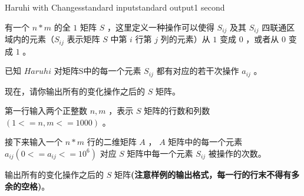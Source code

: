 \begin{problem}{Haruhi with Changes}{standard input}{standard output}{1 second}

有一个 $n*m$ 的全 $1$ 矩阵 $S$ ，这里定义一种操作可以使得 $S_{ij}$ 及其 $S_{ij}$ 四联通区域内的元素（$S_{ij}$ 表示矩阵 $S$ 中第 $i$ 行第 $j$ 列的元素）从 $1$ 变成 $0$ ，或者从 $0$ 变成 $1$ 。

已知 $Haruhi$ 对矩阵S中的每一个元素 $S_{ij}$ 都有对应的若干次操作 $a_{ij}$ 。

现在，请你输出所有的变化操作之后的 $S$ 矩阵。

\InputFile

第一行输入两个正整数 $n,m$ ，表示 $S$ 矩阵的行数和列数 $(1<=n,m<=1000)$ 。

接下来输入一个 $n*m$ 行的二维矩阵 $A$ ， $A$ 矩阵中的每一个元素 $a_{ij}(0<=a_{ij}<=10^6)$ 对应 $S$ 矩阵中每一个元素 $S_{ij}$ 被操作的次数。

\OutputFile

输出所有的变化操作之后的 $S$ 矩阵\textbf{(注意样例的输出格式，每一行的行末不得有多余的空格)}。

\Examples
\begin{example}
%
%
\end{example}
\end{problem}
